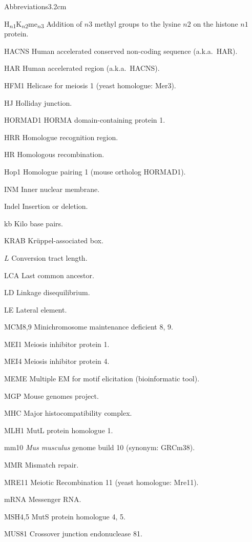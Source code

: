 \begin{mclistof}{Abbreviations}{3.2cm}
\item[H\textsubscript{$n1$}K\textsubscript{$n2$}me\textsubscript{$n3$}] Addition of $n3$ methyl groups to the lysine $n2$ on the histone $n1$ protein.
\item[HACNS] Human accelerated conserved non-coding sequence (a.k.a.\ HAR).
\item[HAR] Human accelerated region (a.k.a.\ HACNS).
\item[HFM1] Helicase for meiosis 1 (yeast homologue: Mer3).
\item[HJ] Holliday junction.
\item[HORMAD1] HORMA domain-containing protein 1.
\item[HRR] Homologue recognition region.
\item[HR] Homologous recombination.
\item[Hop1] Homologue pairing 1 (mouse ortholog HORMAD1).
\item[INM] Inner nuclear membrane.
\item[Indel] Insertion or deletion.
\item[kb] Kilo base pairs.
\item[KRAB] Kr\"uppel-associated box.
\item[$L$] Conversion tract length.
\item[LCA] Last common ancestor.
\item[LD] Linkage disequilibrium.
\item[LE] Lateral element.
\item[MCM8,9] Minichromosome maintenance deficient 8, 9.
\item[MEI1] Meiosis inhibitor protein 1.
\item[MEI4] Meiosis inhibitor protein 4.
\item[MEME] Multiple EM for motif elicitation (bioinformatic tool).
\item[MGP] Mouse genomes project.
\item[MHC] Major histocompatibility complex.
\item[MLH1] MutL protein homologue 1.
\item[mm10] \textit{Mus musculus} genome build 10 (synonym: GRCm38).
\item[MMR] Mismatch repair.
\item[MRE11] Meiotic Recombination 11 (yeast homologue: Mre11).
\item[mRNA] Messenger RNA\@.
\item[MSH4,5] MutS protein homologue 4, 5.
\item[MUS81] Crossover junction endonuclease 81.

\end{mclistof}

